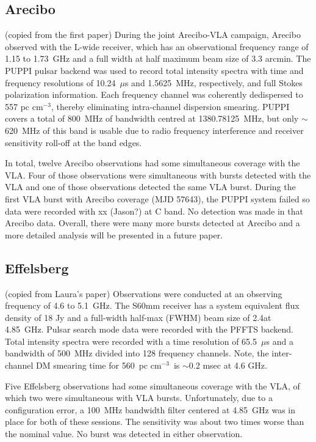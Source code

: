\documentclass[twocolumn]{aastex61}
\begin{document}
\subsection{Arecibo}

(copied from the first paper) 
During the joint Arecibo-VLA campaign, Arecibo observed with the L-wide receiver, which has an observational frequency range of 1.15 to 1.73~GHz and a full width at half maximum beam size of 3.3 arcmin. The PUPPI pulsar backend was used to record total intensity spectra with time and frequency resolutions of 10.24~$\mu$s and 1.5625~MHz, respectively, and full Stokes polarization information. Each frequency channel was coherently dedispersed to 557 pc cm$^{-3}$, thereby eliminating intra-channel dispersion smearing. PUPPI covers a total of 800~MHz of bandwidth centred at 1380.78125~MHz, but only $\sim$ 620~MHz of this band is usable due to radio frequency interference and receiver sensitivity roll-off at the band edges.

In total, twelve Arecibo observations had some simultaneous coverage with the VLA. Four of those observations were simultaneous with bursts detected with the VLA and one of those observations detected the same VLA burst. During the first VLA burst with Arecibo coverage (MJD 57643), the PUPPI system failed so data were recorded with {\color{red} xx (Jason?)} at C band. No detection was made in that Arecibo data. Overall, there were many more bursts detected at Arecibo and a more detailed analysis will be presented in a future paper.

\subsection{Effelsberg}

(copied from Laura's paper)
Observations were conducted at an observing frequency of 4.6 to 5.1~GHz. The S60mm receiver has a system equivalent flux density of 18 Jy and a full-width half-max (FWHM) beam size of 2.4\arcmin at 4.85~GHz. Pulsar search mode data were recorded with the PFFTS backend. Total intensity spectra were recorded with a time resolution of 65.5~$\mu$s and a bandwidth of 500~MHz divided into 128 frequency channels. Note, the inter-channel DM smearing time for 560~pc cm$^{-3}$\ is $\sim$0.2 msec at 4.6 GHz.

Five Effelsberg observations had some simultaneous coverage with the VLA, of which two were simultaneous with VLA bursts. Unfortunately, due to a configuration error, a 100~MHz bandwidth filter centered at 4.85~GHz was in place for both of these sessions. The sensitivity was about two times worse than the nominal value. No burst was detected in either observation.
\end{document}
